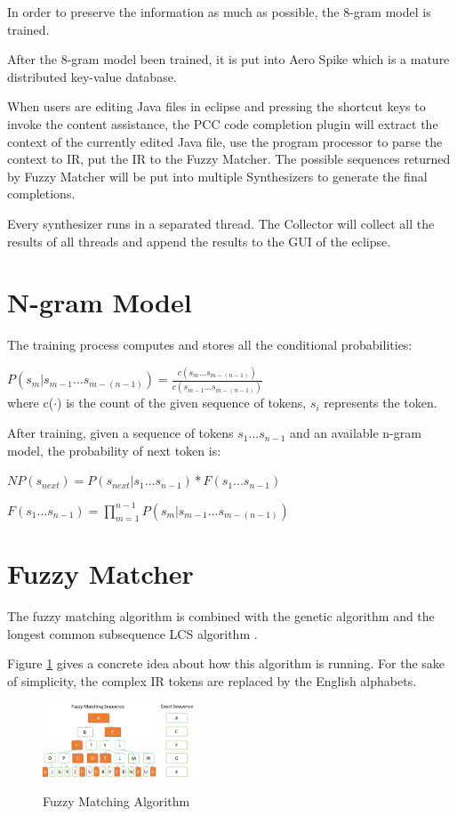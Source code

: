 \documentclass{sig-alternate-05-2015}
\begin{document}
In order to preserve the information as much as possible, the 8-gram model is trained.

After the 8-gram model been trained, it is put into Aero Spike\cite{aerospikedocs} which is a mature distributed key-value database.

When users are editing Java files in eclipse and pressing the shortcut keys to invoke the content assistance, the PCC code completion plugin will extract the context of the currently edited Java file, use the program processor to parse the context to IR, put the IR to the Fuzzy Matcher. The possible sequences returned by Fuzzy Matcher will be put into multiple Synthesizers to generate the final completions.

Every synthesizer runs in a separated thread. The Collector will collect all the results of all threads and append the results to the GUI of the eclipse.

\vspace{-0.1cm}
\section{N-gram Model}

The training process computes and stores all the conditional probabilities:

$P(s_m|s_{m-1}...s_{m-(n-1)}) = \frac{c(s_m...s_{m-(n-1)})}{c(s_{m-1}...s_{m-(n-1)})}$
\\where c($\cdot$) is the count of the given sequence of tokens, $s_i$ represents the token.

After training, given a sequence of tokens $s_1...s_{n-1}$ and an available n-gram model, the probability of next token is:

$NP(s_{next}) = P(s_{next}|s_1...s_{n-1}) * F(s_1...s_{n-1})$

$F(s_1...s_{n-1}) = \prod_{m=1}^{n-1}P(s_m|s_{m-1}...s_{m-(n-1)})$

\section{Fuzzy Matcher}

The fuzzy matching algorithm is combined with the genetic algorithm \cite{geneticalgorithm} and the longest common subsequence LCS algorithm \cite{introalgorithm}.

Figure \ref{fuzzymatch} gives a concrete idea about how this algorithm is running. For the sake of simplicity, the complex IR tokens are replaced by the English alphabets.
\begin{figure}[htbp]
  \centering
  \includegraphics[width=0.42\textwidth]{pics/fuzzymatchshow.png}\\
  \caption{Fuzzy Matching Algorithm}\label{fuzzymatch}
\end{figure}
\vspace{-0.5cm}
\end{document}
